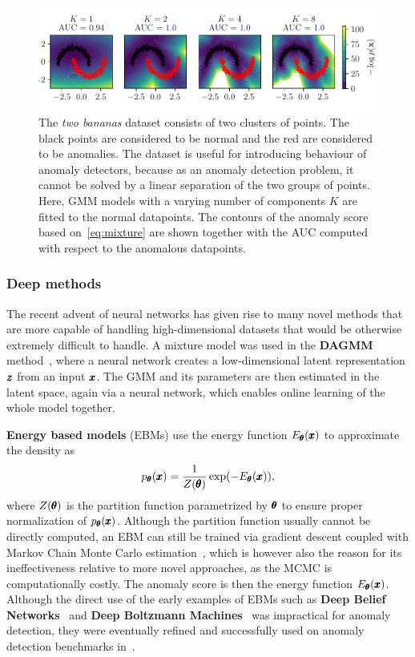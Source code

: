 \begin{figure}
\begin{centering}
\includegraphics[scale=0.98]{data/chapter_intro/gmm_examples.pdf}
\end{centering}
\caption{The \textit{two bananas} dataset consists of two clusters of points. The black points are considered to be normal and the red are considered to be anomalies. The dataset is useful for introducing behaviour of anomaly detectors, because as an anomaly detection problem, it cannot be solved by a linear separation of the two groups of points. Here, GMM models with a varying number of components $K$ are fitted to the normal datapoints. The contours of the anomaly score based on~\eqref{eq:mixture} are shown together with the AUC computed with respect to the anomalous datapoints.}
\label{fig:gmm_examples}
\end{figure}

\subsubsection{Deep methods}
The recent advent of neural networks has given rise to many novel methods that are more capable of handling high-dimensional datasets that would be otherwise extremely difficult to handle. A mixture model was used in the \textbf{DAGMM} method~\cite{zong2018deep}, where a neural network creates a low-dimensional latent representation $\pmb{{z}}$ from an input $\pmb{{x}}$. The GMM and its parameters are then estimated in the latent space, again via a neural network, which enables online learning of the whole model together.

\textbf{Energy based models} (EBMs) use the energy function $E_{\pmb{{\theta}}}(\pmb{{x}})$ to approximate the density as
\begin{equation} \label{eq:ebm}
	p_{\pmb{{\theta}}}(\pmb{{x}}) =  \frac{1}{Z(\pmb{{\theta}})} \exp (- E_{\pmb{{\theta}}}(\pmb{{x}})),
\end{equation}
where $Z(\pmb{{\theta}})$ is the partition function parametrized by $\pmb{{\theta}}$ to ensure proper normalization of $p_{\pmb{{\theta}}}(\pmb{{x}})$. Although the partition function usually cannot be directly computed, an EBM can still be trained via gradient descent coupled with Markov Chain Monte Carlo estimation~\cite{hinton2002training}, which is however also the reason for its ineffectiveness relative to more novel approaches, as the MCMC is computationally costly. The anomaly score is then the energy function $E_{\pmb{{\theta}}}(\pmb{{x}})$. Although the direct use of the early examples of EBMs such as \textbf{Deep Belief Networks}~\cite{hinton2006fast} and \textbf{Deep Boltzmann Machines}~\cite{salakhutdinov2010efficient} was impractical for anomaly detection, they were eventually refined and successfully used on anomaly detection benchmarks in~\cite{zhai2016deep}. 

